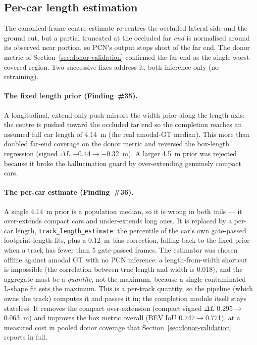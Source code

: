 \subsection{Per-car length estimation}
\label{sec:completion-length}

The canonical-frame centre estimate re-centres the occluded lateral side and the
ground cut, but a partial truncated at the occluded far \emph{end} is normalised
around its observed near portion, so PCN's output stops short of the far end. The
donor metric of Section~\ref{sec:donor-validation} confirmed the far end as the single worst-covered
region. Two successive fixes address it, both inference-only (no retraining).

\paragraph{The fixed length prior (Finding~\#35).} A longitudinal, extend-only
push mirrors the width prior along the length axis: the centre is pushed toward
the occluded far end so the completion reaches an assumed full car length of
\SI{4.14}{\meter} (the real amodal-GT median). This more than doubled far-end
coverage on the donor metric and reversed the box-length regression (signed
$\Delta L$ \SI{-0.44}{}$\to$\SI{-0.32}{\meter}). A larger \SI{4.5}{\meter} prior
was rejected because it broke the hallucination guard by over-extending genuinely
compact cars.

\paragraph{The per-car estimate (Finding~\#36).} A single \SI{4.14}{\meter}
prior is a population median, so it is wrong in both tails --- it over-extends
compact cars and under-extends long ones. It is replaced by a per-car length,
\texttt{track\_length\_estimate}: the  percentile of the car's own
gate-passed footprint-length fits, plus a \SI{0.12}{\meter} bias correction,
falling back to the fixed prior when a track has fewer than \num{5} gate-passed
frames. The estimator was chosen offline against amodal GT with no PCN inference:
a length-from-width shortcut is impossible (the correlation between true length
and width is \num{0.018}), and the aggregate must be a \emph{quantile}, not the
maximum, because a single contaminated L-shape fit sets the maximum. This is a
per-track quantity, so the pipeline (which owns the track) computes it and passes
it in; the completion module itself stays stateless. It removes the compact
over-extension (compact signed $\Delta L$ \SI{+0.295}{}$\to$\SI{+0.063}{\meter})
and improves the box metric overall (BEV IoU \num{0.747}$\to$\num{0.771}), at a
measured cost in pooled donor coverage that Section~\ref{sec:donor-validation} reports in full.

